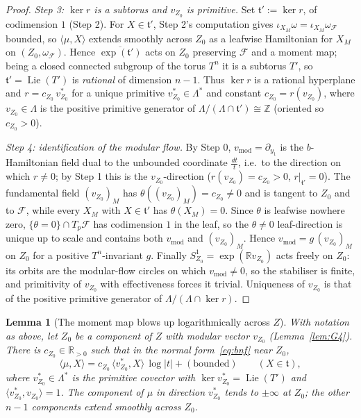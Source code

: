 \documentclass{amsart}
\newtheorem{lemma}{Lemma}
\theoremstyle{definition}
\begin{document}
\begin{proof}
\emph{Step 3: $\ker r$ is a subtorus and $v_{Z_0}$ is primitive.} Set
$\mathfrak t':=\ker r$, of codimension $1$ (Step 2). For $X\in\mathfrak t'$,
Step 2's computation gives $\iota_{X_M}\omega=\iota_{X_M}\omega_{\mathcal F}$
bounded, so $\langle\mu,X\rangle$ extends smoothly across $Z_0$ as a leafwise
Hamiltonian for $X_M$ on $(Z_0,\omega_{\mathcal F})$. Hence
$\overline{\exp(\mathfrak t')}$ acts on $Z_0$ preserving $\mathcal F$ and a
moment map; being a closed connected subgroup of the torus $T^n$ it is a
subtorus $T'$, so $\mathfrak t'=\operatorname{Lie}(T')$ is \emph{rational} of
dimension $n-1$. Thus $\ker r$ is a rational hyperplane and $r=c_{Z_0}\,
v^*_{Z_0}$ for a unique primitive $v^*_{Z_0}\in\Lambda^*$ and constant
$c_{Z_0}=r(v_{Z_0})$, where $v_{Z_0}\in\Lambda$ is the positive primitive
generator of $\Lambda/(\Lambda\cap\mathfrak t')\cong\mathbb Z$ (oriented so
$c_{Z_0}>0$).

\emph{Step 4: identification of the modular flow.} By Step 0,
$v_{\mathrm{mod}}=\partial_{y_1}$ is the $b$-Hamiltonian field dual to the
unbounded coordinate $\tfrac{dt}{t}$, i.e.\ to the direction on which $r\neq0$;
by Step 1 this is the $v_{Z_0}$-direction ($r(v_{Z_0})=c_{Z_0}>0$,
$r|_{\mathfrak t'}=0$). The fundamental field $(v_{Z_0})_M$ has
$\theta((v_{Z_0})_M)=c_{Z_0}\neq0$ and is tangent to $Z_0$ and to $\mathcal F$,
while every $X_M$ with $X\in\mathfrak t'$ has $\theta(X_M)=0$. Since $\theta$ is
leafwise nowhere zero, $\{\theta=0\}\cap T_p\mathcal F$ has codimension $1$ in
the leaf, so the $\theta\neq0$ leaf-direction is unique up to scale and contains
both $v_{\mathrm{mod}}$ and $(v_{Z_0})_M$. Hence $v_{\mathrm{mod}}=g\,(v_{Z_0})_M$
on $Z_0$ for a positive $T^n$-invariant $g$. Finally $S^1_{Z_0}=\exp(\mathbb R
v_{Z_0})$ acts freely on $Z_0$: its orbits are the modular-flow circles on which
$v_{\mathrm{mod}}\neq0$, so the stabiliser is finite, and primitivity of
$v_{Z_0}$ with effectiveness forces it trivial. Uniqueness of $v_{Z_0}$ is that
of the positive primitive generator of $\Lambda/(\Lambda\cap\ker r)$.
\end{proof}

\begin{lemma}[The moment map blows up logarithmically across $Z$]\label{lem:blowup}
With notation as above, let $Z_0$ be a component of $Z$ with modular vector
$v_{Z_0}$ (Lemma~\ref{lem:G4}). There is $c_{Z_0}\in\mathbb R_{>0}$ such that in
the normal form~\eqref{eq:bnf} near $Z_0$,
\begin{equation}\label{eq:logmu}
\langle\mu,X\rangle=c_{Z_0}\,\langle v^*_{Z_0},X\rangle\,\log|t|+(\text{bounded})
\qquad(X\in\mathfrak t),
\end{equation}
where $v^*_{Z_0}\in\Lambda^*$ is the primitive covector with
$\ker v^*_{Z_0}=\operatorname{Lie}(T')$ and $\langle v^*_{Z_0},v_{Z_0}\rangle=1$.
The component of $\mu$ in direction $v^*_{Z_0}$ tends to $\pm\infty$ at $Z_0$;
the other $n-1$ components extend smoothly across $Z_0$.
\end{lemma}
\end{document}
